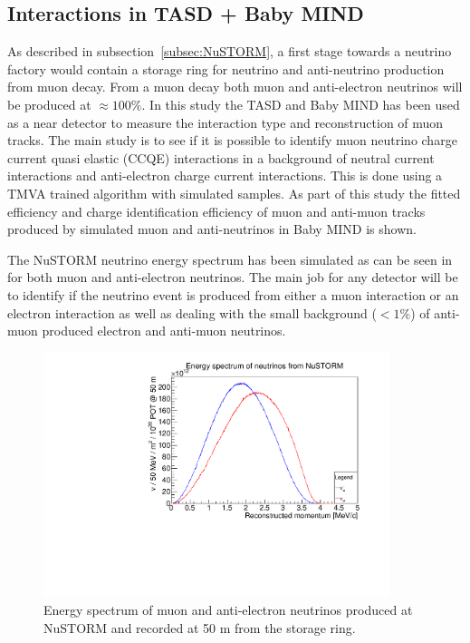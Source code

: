 

\pagebreak
\subsection{Interactions in TASD + Baby MIND}

As described in subsection~\ref{subsec:NuSTORM}, a first stage towards a neutrino factory would contain a storage ring for neutrino and anti-neutrino production from muon decay. From a muon decay both muon and anti-electron neutrinos will be produced at $\approx 100\%$. In this study the TASD and Baby MIND has been used as a near detector to measure the interaction type and reconstruction of muon tracks. The main study is to see if it is possible to identify muon neutrino charge current quasi elastic (CCQE) interactions in a background of neutral current interactions and anti-electron charge current interactions. This is done using a TMVA trained algorithm with simulated samples. As part of this study the fitted efficiency and charge identification efficiency of muon and anti-muon tracks produced by simulated muon and anti-neutrinos in Baby MIND is shown.

The NuSTORM neutrino energy spectrum has been simulated as can be seen in  for both muon and anti-electron neutrinos. The main job for any detector will be to identify if the neutrino event is produced from either a muon interaction or an electron interaction as well as dealing with the small background ($<1\%$) of anti-muon produced electron and anti-muon neutrinos.

\begin{figure}[h!]
\centering
\includegraphics[width=0.9\textwidth]{figures/eSpectrum.pdf}
\caption{Energy spectrum of muon and anti-electron neutrinos produced at NuSTORM and recorded at 50 m from the storage ring.}
\label{fig:NuSTORMeSpectrum}
\end{figure}

